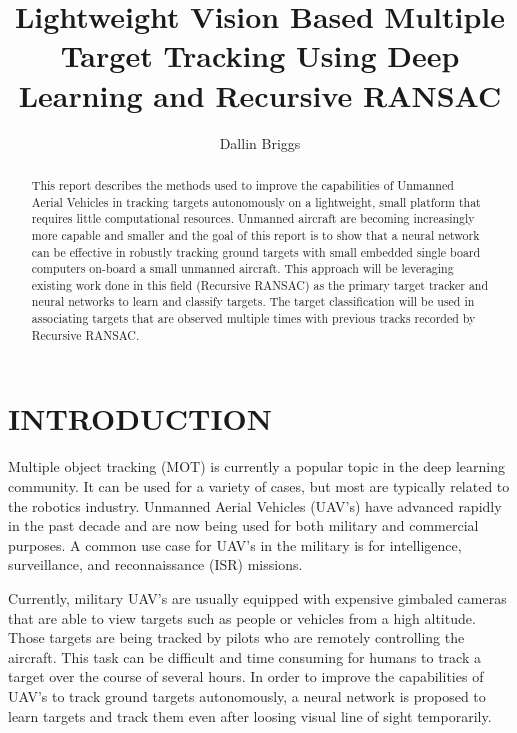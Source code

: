 \documentclass[letterpaper, 10 pt, conference]{ieeeconf}  %
\title{\LARGE \bf
Lightweight Vision Based Multiple Target Tracking Using Deep Learning and Recursive RANSAC
}
\author{Dallin Briggs}
\begin{document}
\maketitle
\thispagestyle{empty}
\pagestyle{empty}


\begin{abstract}

This report describes the methods used to improve the capabilities of Unmanned Aerial Vehicles in tracking targets autonomously on a lightweight, small platform that requires little computational resources. Unmanned aircraft are becoming increasingly more capable and smaller and the goal of this report is to show that a neural network can be effective in robustly tracking ground targets with small embedded single board computers on-board a small unmanned aircraft. This approach will be leveraging existing work done in this field (Recursive RANSAC) as the primary target tracker and neural networks to learn and classify targets. The target classification will be used in associating targets that are observed multiple times with previous tracks recorded by Recursive RANSAC.

\end{abstract}


\section{INTRODUCTION}

Multiple object tracking (MOT) is currently a popular topic in the deep learning community. It can be used for a variety of cases, but most are typically related to the robotics industry. Unmanned Aerial Vehicles (UAV's) have advanced rapidly in the past decade and are now being used for both military and commercial purposes. A common use case for UAV's in the military is for intelligence, surveillance, and reconnaissance (ISR) missions. 

Currently, military UAV's are usually equipped with expensive gimbaled cameras that are able to view targets such as people or vehicles from a high altitude. Those targets are being tracked by pilots who are remotely controlling the aircraft. This task can be difficult and time consuming for humans to track a target over the course of several hours. In order to improve the capabilities of UAV's to track ground targets autonomously, a neural network is proposed to learn targets and track them even after loosing visual line of sight temporarily.
\end{document}
